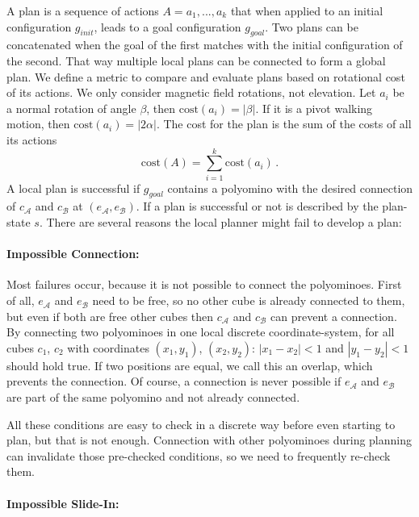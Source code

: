 A plan is a sequence of actions $A = a_1, ... , a_k$ that when applied to an initial configuration $g_\textit{init}$, leads to a goal configuration $g_\textit{goal}$.
Two plans can be concatenated when the goal of the first matches with the initial configuration of the second.
That way multiple local plans can be connected to form a global plan.
We define a metric to compare and evaluate plans based on rotational cost of its actions.
We only consider magnetic field rotations, not elevation.
Let $a_i$ be a normal rotation of angle $\beta$, then $\text{cost}(a_i) = |\beta|$.
If it is a pivot walking motion, then $\text{cost}(a_i) = |2\alpha|$.
The cost for the plan is the sum of the costs of all its actions
\begin{equation}
\text{cost}(A) = \sum_{i=1}^{k} \text{cost}(a_i) \,.
\end{equation}
A local plan is successful if $g_\textit{goal}$ contains a polyomino with the desired connection of $c_\mathcal{A}$ and $c_\mathcal{B}$ at $(e_\mathcal{A}, e_\mathcal{B})$.
If a plan is successful or not is described by the plan-state $s$.
There are several reasons the local planner might fail to develop a plan:

\paragraph{Impossible Connection:}

Most failures occur, because it is not possible to connect the polyominoes.
First of all, $e_\mathcal{A}$ and $e_\mathcal{B}$ need to be free, so no other cube is already connected to them, but even if both are free other cubes then $c_\mathcal{A}$ and $c_\mathcal{B}$ can prevent a connection.
By connecting two polyominoes in one local discrete coordinate-system, for all cubes $c_1$, $c_2$ with coordinates $(x_1, y_1)$, $(x_2, y_2)$: $\left|x_1 - x_2\right| < 1$ and $\left|y_1 - y_2\right| < 1$ should hold true.
If two positions are equal, we call this an overlap, which prevents the connection.
Of course, a connection is never possible if $e_\mathcal{A}$ and $e_\mathcal{B}$ are part of the same polyomino and not already connected.

All these conditions are easy to check in a discrete way before even starting to plan, but that is not enough.
Connection with other polyominoes during planning can invalidate those pre-checked conditions, so we need to frequently re-check them.

\paragraph{Impossible Slide-In:}

